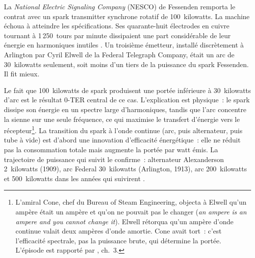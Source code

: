 La \emph{National Electric Signaling Company} (NESCO) de Fessenden remporta le contrat avec un spark transmitter synchrone rotatif de 100~kilowatts. La machine échoua à atteindre les spécifications. Ses quarante-huit électrodes en cuivre tournant à 1\,250~tours par minute dissipaient une part considérable de leur énergie en harmoniques inutiles \parencite{aitken_continuous_1985}. Un troisième émetteur, installé discrètement à Arlington par Cyril Elwell de la Federal Telegraph Company, était un arc de 30~kilowatts seulement, soit moins d'un tiers de la puissance du spark Fessenden. Il fit mieux.

%
Le fait que 100~kilowatts de spark produisent une portée inférieure à 30~kilowatts d'arc est le résultat 0-TER central de ce cas. L'explication est physique~: le spark dissipe son énergie en un spectre large d'harmoniques, tandis que l'arc concentre la sienne sur une seule fréquence, ce qui maximise le transfert d'énergie vers le récepteur\footnote{L'amiral Cone, chef du Bureau of Steam Engineering, objecta à Elwell qu'un ampère était un ampère et qu'on ne pouvait pas le changer (\og \emph{an ampere is an ampere and you cannot change it}\fg{}). Elwell rétorqua qu'un ampère d'onde continue valait deux ampères d'onde amortie. Cone avait tort~: c'est l'efficacité spectrale, pas la puissance brute, qui détermine la portée. L'épisode est rapporté par \textcite{aitken_continuous_1985}, ch.~3.}. La transition du spark à l'onde continue (arc, puis alternateur, puis tube à vide) est d'abord une innovation d'efficacité énergétique~: elle ne réduit pas la consommation totale mais augmente la portée par watt émis. La trajectoire de puissance qui suivit le confirme~: alternateur Alexanderson 2~kilowatts (1909), arc Federal 30~kilowatts (Arlington, 1913), arc 200~kilowatts et 500~kilowatts dans les années qui suivirent \parencite{aitken_continuous_1985}.


